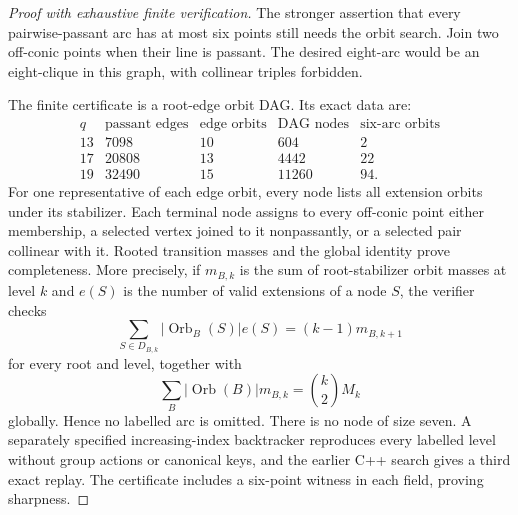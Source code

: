 \documentclass[11pt]{article}
\theoremstyle{remark}
\begin{document}
\begin{proof}[Proof with exhaustive finite verification]
The stronger assertion that every pairwise-passant arc has at most six
points still needs the orbit search.  Join two off-conic points when their
line is passant. The desired eight-arc would be an eight-clique in this
graph, with collinear triples forbidden.

The finite certificate is a root-edge orbit DAG.  Its exact data are:
\[
\begin{array}{c|r|r|r|r}
q&\text{passant edges}&\text{edge orbits}&\text{DAG nodes}&
 \text{six-arc orbits}\\ \hline
13&7098&10&604&2\\
17&20808&13&4442&22\\
19&32490&15&11260&94.
\end{array}
\]
For one representative of each edge orbit, every node lists all extension
orbits under its stabilizer.  Each terminal node assigns to every off-conic
point either membership, a selected vertex joined to it nonpassantly, or a
selected pair collinear with it.  Rooted transition masses and the global
identity prove completeness.  More precisely, if $m_{B,k}$ is the sum of
root-stabilizer orbit masses at level $k$ and $e(S)$ is the number of valid
extensions of a node $S$, the verifier checks
\[
 \sum_{S\in D_{B,k}}|\operatorname{Orb}_B(S)|e(S)
   =(k-1)m_{B,k+1}
\]
for every root and level, together with
\[
 \sum_B |\operatorname{Orb}(B)|m_{B,k}=\binom{k}{2}M_k
\]
globally.  Hence no labelled arc is omitted.  There is no node of size seven.  A
separately specified increasing-index backtracker reproduces every labelled
level without group actions or canonical keys, and the earlier C++ search
gives a third exact replay.  The certificate includes a six-point witness in
each field, proving sharpness.
\end{proof}
\end{document}
